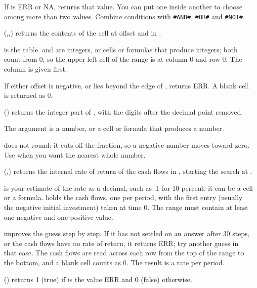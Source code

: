 If  is ERR or NA,  returns that value. You can put one  inside another to choose among more than two values. Combine conditions with \texttt{\#AND\#}, \texttt{\#OR\#} and \texttt{\#NOT\#}.

\Examples
{}

(,,) returns the contents of the cell at offset  and  in .

 is the table.  and  are integers, or cells or formulas that produce integers; both count from 0, so the upper left cell of the range is at column 0 and row 0. The column is given first.

If either offset is negative, or lies beyond the edge of ,  returns ERR. A blank cell is returned as 0.

\Examples
{}

() returns the integer part of , with the digits after the decimal point removed.

The argument  is a number, or a cell or formula that produces a number.

 does not round: it cuts off the fraction, so a negative number moves toward zero. Use  when you want the nearest whole number.

\Examples
{}

(,) returns the internal rate of return of the cash flows in , starting the search at .

 is your estimate of the rate as a decimal, such as .1 for 10 percent; it can be a cell or a formula.  holds the cash flows, one per period, with the first entry (usually the negative initial investment) taken at time 0. The range must contain at least one negative and one positive value.

 improves the guess step by step. If it has not settled on an answer after 30 steps, or the cash flows have no rate of return, it returns ERR; try another guess in that case. The cash flows are read across each row from the top of the range to the bottom, and a blank cell counts as 0. The result is a rate per period.

\Examples
{}

() returns 1 (true) if  is the value ERR and 0 (false) otherwise.

